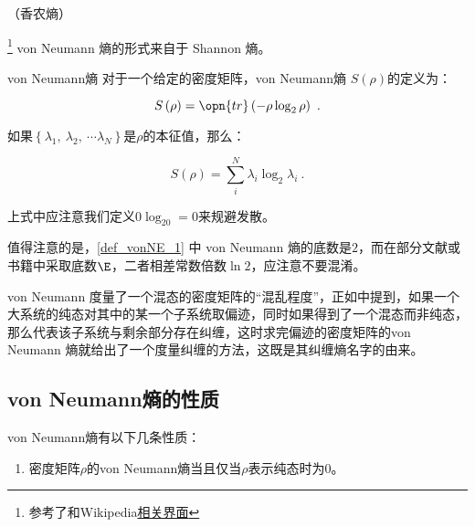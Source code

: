 
\begin{issues}
\issueTODO
\issueMissDepend（香农熵）
\end{issues}


\footnote{参考了\cite{量子信息}和Wikipedia\href{https://en.wikipedia.org/wiki/Von_Neumann_entropy}{相关界面}}
von Neumann 熵的形式来自于 Shannon 熵。

\begin{definition}{von Neumann熵}\label{def_vonNE_1}
对于一个给定的密度矩阵，von Neumann熵 $S\left(\rho\right)$的定义为：

\begin{equation}
S\left( \rho \right) = \opn{tr}\left( - \rho \log_2 \rho \right)~.
\end{equation}

如果$\left\{ \lambda_1,~\lambda_2,~\cdots \lambda_N \right\}$是$\rho$的本征值，那么：

\begin{equation}
S\left(\rho\right) = \sum_i^N \lambda_i \log_2 \lambda_i~.
\end{equation}

上式中应注意我们定义$0\log_20 = 0$来规避发散。

\end{definition}

值得注意的是，\autoref{def_vonNE_1} 中 von Neumann 熵的底数是$2$，而在部分文献或书籍中采取底数$\E$，二者相差常数倍数$\ln 2$，应注意不要混淆。

von Neumann 度量了一个混态的密度矩阵的“混乱程度”，正如中提到，如果一个大系统的纯态对其中的某一个子系统取偏迹，同时如果得到了一个混态而非纯态，那么代表该子系统与剩余部分存在纠缠，这时求完偏迹的密度矩阵的von Neumann 熵就给出了一个度量纠缠的方法，这既是其纠缠熵名字的由来。

\subsection{von Neumann熵的性质}

von Neumann熵有以下几条性质：

\begin{enumerate}
\item 密度矩阵$\rho$的von Neumann熵当且仅当$\rho$表示纯态时为0。
\end{enumerate}

